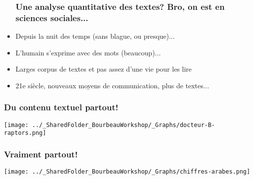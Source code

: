 \documentclass{beamer}
\begin{document}
 \begin{frame}
      
      \begin{itemize}
       
         \frametitle{Une analyse quantitative des textes? Bro, on est en sciences sociales...} \vspace{1cm}
       
            \item Depuis la nuit des temps (sans blague, ou presque)...
            
            \item L'humain s'exprime avec des mots (beaucoup)...
            
            \item Larges corpus de textes et pas assez d'une vie pour les lire
            
            \item 21e siècle, nouveaux moyens de communication, plus de textes...
       
      \end{itemize}
       
  \end{frame}
     
          
\begin{frame}
      
   \frametitle{Du contenu textuel partout!} \vspace{1cm}
        \begin{center}
        \texttt{[image: ../\_SharedFolder\_BourbeauWorkshop/\_Graphs/docteur-B-raptors.png]} 
    \end{center}
      
 \end{frame}
     
          
 \begin{frame}
      
    \frametitle{Vraiment partout!} \vspace{1cm}
      
        \begin{center}
         \texttt{[image: ../\_SharedFolder\_BourbeauWorkshop/\_Graphs/chiffres-arabes.png]}
      \end{center}
      
  \end{frame}
     
     
          
\end{document}
